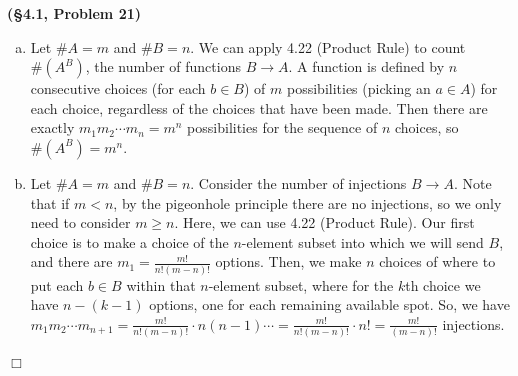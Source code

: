 \documentclass[12pt]{article}
\theoremstyle{definition}
\newenvironment{Solution}{\noindent {\sc Solution.}}{$\Box$ \vspace{2 ex}}
\begin{document}
\begin{Solution}
{\bf (\S4.1, Problem 21)}\\
\begin{enumerate}[(a)]
\item Let $\# A = m$ and $\# B = n$. We can apply 4.22 (Product Rule) to count $\#\left(A^B\right)$, the number of functions $B \to A$. A function is defined by $n$ consecutive choices (for each $b \in B$) of $m$ possibilities (picking an $a \in A$) for each choice, regardless of the choices that have been made. Then there are exactly $m_1 m_2 \cdots m_n = m^n$ possibilities for the sequence of $n$ choices, so $\#\left(A^B\right) = m^n$.
\item Let $\# A = m$ and $\# B = n$. Consider the number of injections $B\to A$. Note that if $m < n$, by the pigeonhole principle there are no injections, so we only need to consider $m \ge n$. Here, we can use 4.22 (Product Rule). Our first choice is to make a choice of the $n$-element subset into which we will send $B$, and there are $m_1 = \frac{m!}{n!(m-n)!}$ options. Then, we make $n$ choices of where to put each $b \in B$ within that $n$-element subset, where for the $k$th choice we have $n-(k-1)$ options, one for each remaining available spot. So, we have $m_1 m_2 \cdots m_{n+1} = \frac{m!}{n!(m-n)!} \cdot n(n-1)\cdots = \frac{m!}{n!(m-n)!} \cdot n! = \frac{m!}{(m-n)!}$ injections.

\end{enumerate}
\end{Solution}
\end{document}
